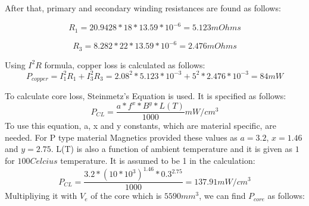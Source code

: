 \documentclass{article}
\newcommand\tab[1][1cm]{\hspace*{#1}}
\begin{document}
After that, primary and secondary winding resistances are found as follows:

\begin{equation*}
    R_{1}=20.9428*18*13.59*10^{-6}=5.123 mOhms
\end{equation*}

\begin{equation*}
    R_{3}=8.282*22*13.59*10^{-6}=2.476 mOhms
\end{equation*}

Using $I^2R$ formula, copper loss is calculated as follows:
\begin{equation*}
    P_{copper}=I_1^2R_1+I_3^2R_3=2.08^2*5.123*10^{-3}+5^2*2.476*10^{-3}=84 mW
\end{equation*}

\tab To calculate core loss, Steinmetz's Equation is used. It is specified as follows:
\begin{equation*}
    P_{CL}=\frac{a*f^x*B^y*L(T)}{1000} mW/cm^3
\end{equation*}
\tab To use this equation, a, x and y constants, which are material specific, are needed. For P type material Magnetics provided these values as $a=3.2$, $x=1.46$ and $y=2.75$. L(T) is also a function of ambient temperature and it is given as $1$ for $100 Celcius$ temperature. It is assumed to be 1 in the calculation:
\begin{equation*}
     P_{CL}=\frac{3.2*(10*10^3)^{1.46}*0.3^2.75}{1000}=137.91 mW/cm^3
\end{equation*}
Multipliying it with $V_e$ of the core which is $5590 mm^3$, we can find $P_{core}$ as follows:
\end{document}
